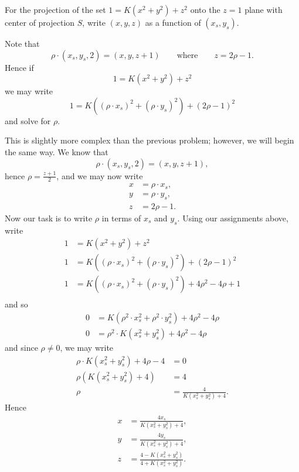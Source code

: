 \documentclass[newpage,hints,handout,12pt,noauthor,nooutcomes]{ximera}
\begin{document}
\begin{problem}
  For the projection of the set $1=K\left(x^{2}+y^{2}\right)+z^{2}$
  onto the $z=1$ plane with center of projection $S$, write
  $(x,y,z)$ as a function of $(x_s,y_s)$.
  \begin{hint}
    Note that
      \[
      \rho\cdot(x_{s},y_{s},2)=(x,y,z+1) \qquad\text{where}\qquad z = 2\rho-1.
      \]
    Hence if
    \[
    1 = K\left(x^2 + y^2\right) + z^2
    \]
    we may write
    \[
    1 = K\left((\rho\cdot x_s)^2 + (\rho\cdot y_s)^2\right) + (2\rho-1)^2
    \]
    and solve for $\rho$.
  \end{hint}
  \begin{freeResponse}
    This is slightly more complex than the previous problem; however,
    we will begin the same way. We know that
    \[
    \rho\cdot(x_{s},y_{s},2)=(x,y,z+1),
    \]
    hence $\rho=\frac{z+1}{2}$, and we may now write
    \begin{align*}
      x &= \rho \cdot x_s,\\
      y &= \rho \cdot y_s,\\
      z &= 2\rho-1.
    \end{align*}
    Now our task is to write $\rho$ in terms of $x_s$ and
    $y_s$. Using our assignments above, write
    \begin{align*}
      1 &= K\left(x^2 + y^2\right) + z^2\\
      1 &= K\left((\rho\cdot x_s)^2 + (\rho\cdot y_s)^2\right) + (2\rho-1)^2\\
      1 &= K\left((\rho\cdot x_s)^2 + (\rho\cdot y_s)^2\right) + 4\rho^2-4\rho + 1\\
    \end{align*}
    and so
    \begin{align*}
      0 &= K\left(\rho^2\cdot x_s^2 + \rho^2\cdot y_s^2\right) + 4\rho^2-4\rho\\
      0 &= \rho^2\cdot K\left(x_s^2 + y_s^2\right) + 4\rho^2-4\rho
    \end{align*}
    and since $\rho \ne 0$, we may write
    \begin{align*}
      \rho\cdot K\left(x_s^2 + y_s^2\right) + 4\rho-4 &=0 \\
      \rho\left(K\left(x_s^2 + y_s^2\right) + 4\right) &=4\\
      \rho &= \frac{4}{K\left(x_s^2 + y_s^2\right) + 4}.
    \end{align*}
    Hence
    \begin{align*}
      x &= \frac{4x_s}{K\left(x_s^2 + y_s^2\right) + 4},\\
      y &= \frac{4y_s}{K\left(x_s^2 + y_s^2\right) + 4},\\
      z &= \frac{4-K\left(x_s^2 + y_s^2\right)}{4+K\left(x_s^2 + y_s^2\right)}.
    \end{align*}
  \end{freeResponse}
\end{problem}
\end{document}
